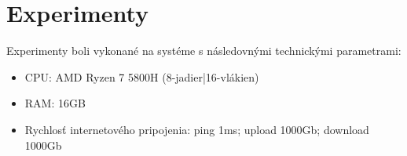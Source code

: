 \documentclass[10pt,xcolor=pdflatex,dvipsnames,table,oneside]{book}
\begin{document}


\chapter{Experimenty}
\par Experimenty boli vykonané na systéme s následovnými technickými parametrami:
\begin{itemize}
    \item CPU: AMD Ryzen 7 5800H (8-jadier|16-vlákien)
    \item RAM: 16GB
    \item Rychlosť internetového pripojenia:  ping 1ms; upload 1000Gb; download 1000Gb
\end{itemize}
\newline 
\end{document}
